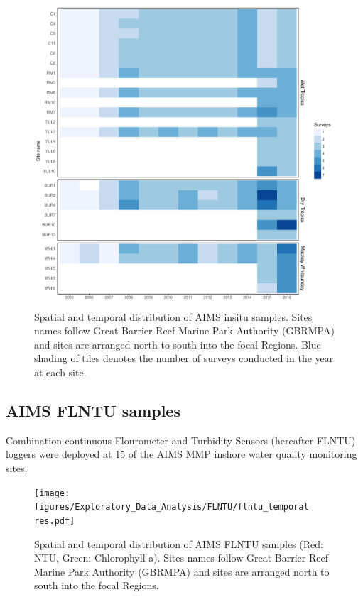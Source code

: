 \begin{figure}[ptbh]
\includegraphics[width=1\linewidth]{figures/Maps/Insitu_sites/Samples_spatial_temporal.pdf}
\caption{Spatial and temporal distribution of AIMS insitu samples.  Sites names follow Great Barrier
Reef Marine Park Authority (GBRMPA) and sites are arranged north to south into the focal
Regions. Blue shading of tiles denotes the number of surveys conducted in the year at each
site.}\label{fig:AIMS_insitu_spatial_temporal}
\end{figure}
 


\clearpage

\subsection{AIMS FLNTU samples}
  
Combination continuous Flourometer and Turbidity Sensors (hereafter FLNTU) loggers were deployed at
15 of the AIMS MMP inshore water quality monitoring sites.
 
 

\begin{figure}[ptbh] \texttt{[image: figures/Exploratory\_Data\_Analysis/FLNTU/flntu\_temporal\\res.pdf]}
\caption{Spatial and temporal distribution of AIMS FLNTU samples (Red: NTU, Green: Chlorophyll-a).
Sites names follow Great Barrier Reef Marine Park Authority (GBRMPA) and sites are arranged north to
south into the focal Regions.}\label{fig:flntu_temporal}
\end{figure}

